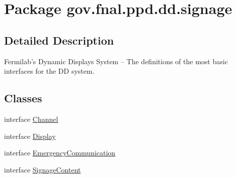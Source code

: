 \hypertarget{namespacegov_1_1fnal_1_1ppd_1_1dd_1_1signage}{\section{Package gov.\-fnal.\-ppd.\-dd.\-signage}
\label{namespacegov_1_1fnal_1_1ppd_1_1dd_1_1signage}
}


\subsection{Detailed Description}
Fermilab's Dynamic Displays System -- The definitions of the most basic interfaces for the D\-D system.\subsection*{Classes}
\begin{DoxyCompactItemize}
\item 
interface \hyperlink{interfacegov_1_1fnal_1_1ppd_1_1dd_1_1signage_1_1Channel}{Channel}
\item 
interface \hyperlink{interfacegov_1_1fnal_1_1ppd_1_1dd_1_1signage_1_1Display}{Display}
\item 
interface \hyperlink{interfacegov_1_1fnal_1_1ppd_1_1dd_1_1signage_1_1EmergencyCommunication}{Emergency\-Communication}
\item 
interface \hyperlink{interfacegov_1_1fnal_1_1ppd_1_1dd_1_1signage_1_1SignageContent}{Signage\-Content}
\end{DoxyCompactItemize}
